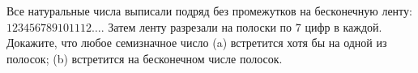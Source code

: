 Все натуральные числа выписали подряд без промежутков на бесконечную ленту: $123456789101112\ldots$. Затем ленту разрезали на полоски по $7$ цифр в каждой. Докажите, что любое семизначное число (a) встретится хотя бы на одной из полосок; (b) встретится на бесконечном числе полосок.